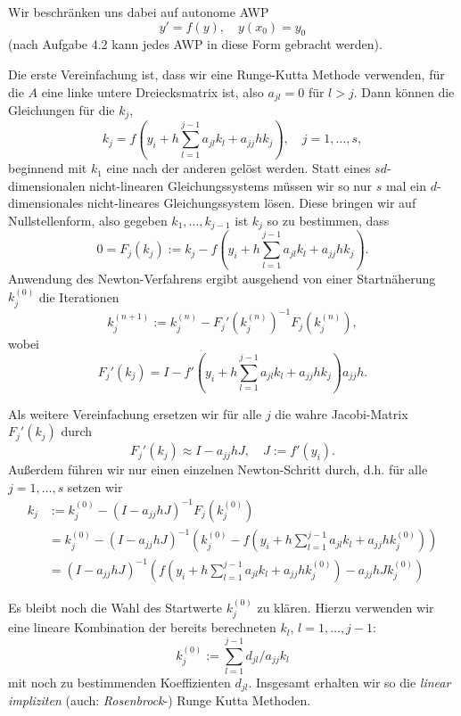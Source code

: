 \documentclass[
]{mycourse}
\theoremstyle{mythm}
\theoremstyle{break}
\begin{document}
Wir beschränken uns dabei auf autonome AWP
\[
y'=f(y), \quad y(x_0)=y_0
\]
(nach Aufgabe 4.2 kann jedes AWP in diese Form gebracht werden).

Die erste Vereinfachung ist, dass wir eine Runge-Kutta Methode verwenden, für die $A$ eine linke untere Dreiecksmatrix ist, also  $a_{jl}=0$ für $l>j$. Dann können die Gleichungen für die $k_j$,
\[
k_j=f(y_i + h \sum_{l=1}^{j-1} a_{jl} k_l +  a_{jj} h k_j), \quad j=1,\ldots,s,
\]
beginnend mit $k_1$ eine nach der anderen gelöst werden. Statt eines $sd$-dimensionalen nicht-linearen
Gleichungssystems müssen wir so nur $s$ mal ein $d$-dimensionales nicht-lineares Gleichungssystem lösen.
Diese bringen wir auf Nullstellenform, also gegeben $k_1,\ldots,k_{j-1}$ ist $k_j$ so zu bestimmen, dass
\[
0=F_j(k_j):=k_j - f(y_i + h \sum_{l=1}^{j-1} a_{jl} k_l +  a_{jj} h k_j).
\]
Anwendung des Newton-Verfahrens ergibt ausgehend von einer Startnäherung $k_j^{(0)}$ die 
Iterationen
\[
k_j^{(n+1)}:=k_j^{(n)}-F_j'(k_j^{(n)})^{-1}F_j(k_j^{(n)}),
\]
wobei
\[
F_j'(k_j)=I- f'(y_i + h \sum_{l=1}^{j-1} a_{jl} k_l +  a_{jj} h k_j)a_{jj} h.
\]

Als weitere Vereinfachung ersetzen wir für alle $j$ die wahre Jacobi-Matrix $F_j'(k_j)$ durch 
\[
F_j'(k_j)\approx I- a_{jj} h J, \quad  J:=f'(y_i).
\] 
Außerdem führen wir nur einen einzelnen Newton-Schritt durch, d.h. für alle $j=1,\ldots, s$ setzen wir
\begin{align*}
 k_j & :=k_j^{(0)}-(I- a_{jj} h J)^{-1} F_j(k_j^{(0)})\\
&= k_j^{(0)}-(I- a_{jj} h J)^{-1} \left( k^{(0)}_j - f(y_i + h \sum_{l=1}^{j-1} a_{jl} k_l +  a_{jj} h k_j^{(0)}) \right)\\
&= (I- a_{jj} h J)^{-1} \left( f(y_i + h \sum_{l=1}^{j-1} a_{jl} k_l +  a_{jj} h k_j^{(0)}) - a_{jj} h J k_j^{(0)} \right)
\end{align*}

Es bleibt noch die Wahl des Startwerte $k_j^{(0)}$ zu klären. Hierzu verwenden wir eine 
lineare Kombination der bereits berechneten $k_l$, $l=1,\ldots,j-1$:
\[
k_j^{(0)}:=\sum_{l=1}^{j-1} d_{jl} / a_{jj} k_l
\]
mit noch zu bestimmenden Koeffizienten $d_{jl}$. Insgesamt erhalten wir so die \emph{linear impliziten} (auch: \emph{Rosenbrock}-) Runge Kutta Methoden.

\begin{center}
\end{center}
\end{document}
